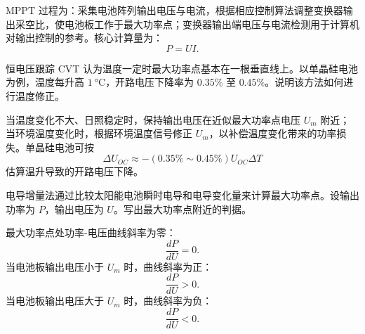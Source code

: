\begin{solution}
MPPT 过程为：采集电池阵列输出电压与电流，根据相应控制算法调整变换器输出采空比，使电池板工作于最大功率点；变换器输出端电压与电流检测用于计算机对输出控制的参考。核心计算量为：
\begin{equation}
P = UI.
\end{equation}
\end{solution}

\begin{problem}[恒电压跟踪温度修正]\label{exer:calc_04_solar_p171_01}
恒电压跟踪 CVT 认为温度一定时最大功率点基本在一根垂直线上。以单晶硅电池为例，温度每升高 \(\qty{1}{\degreeCelsius}\)，开路电压下降率为 \(0.35\%\) 至 \(0.45\%\)。说明该方法如何进行温度修正。
\end{problem}

\begin{solution}
当温度变化不大、日照稳定时，保持输出电压在近似最大功率点电压 \(U_m\) 附近；当环境温度变化时，根据环境温度信号修正 \(U_m\)，以补偿温度变化带来的功率损失。单晶硅电池可按
\begin{equation}
\Delta U_{OC} \approx -(0.35\%\sim0.45\%)U_{OC}\Delta T
\end{equation}
估算温升导致的开路电压下降。
\end{solution}

\begin{problem}[电导增量法最大功率点判据]\label{exer:calc_04_solar_p172_01}
电导增量法通过比较太阳能电池瞬时电导和电导变化量来计算最大功率点。设输出功率为 \(P\)，输出电压为 \(U\)。写出最大功率点附近的判据。
\end{problem}

\begin{solution}
最大功率点处功率-电压曲线斜率为零：
\begin{equation}
\frac{dP}{dU} = 0.
\end{equation}
当电池板输出电压小于 \(U_m\) 时，曲线斜率为正：
\begin{equation}
\frac{dP}{dU} > 0.
\end{equation}
当电池板输出电压大于 \(U_m\) 时，曲线斜率为负：
\begin{equation}
\frac{dP}{dU} < 0.
\end{equation}
\end{solution}
